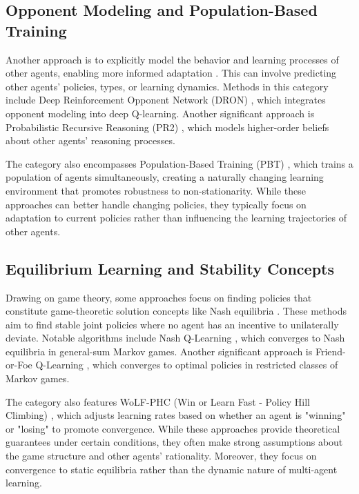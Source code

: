 \documentclass[a4paper,12pt]{report}
\begin{document}
\subsection{Opponent Modeling and Population-Based Training}
Another approach is to explicitly model the behavior and learning processes of other agents, enabling more informed adaptation \cite{albrecht2018autonomous, he2016opponent}. This can involve predicting other agents' policies, types, or learning dynamics. Methods in this category include Deep Reinforcement Opponent Network (DRON) \cite{he2016opponent}, which integrates opponent modeling into deep Q-learning. Another significant approach is Probabilistic Recursive Reasoning (PR2) \cite{wen2019probabilistic}, which models higher-order beliefs about other agents' reasoning processes.

The category also encompasses Population-Based Training (PBT) \cite{jaderberg2019human}, which trains a population of agents simultaneously, creating a naturally changing learning environment that promotes robustness to non-stationarity. While these approaches can better handle changing policies, they typically focus on adaptation to current policies rather than influencing the learning trajectories of other agents.

\subsection{Equilibrium Learning and Stability Concepts}
Drawing on game theory, some approaches focus on finding policies that constitute game-theoretic solution concepts like Nash equilibria \cite{bowling2005convergence, hu2003nash, littman2001friend}. These methods aim to find stable joint policies where no agent has an incentive to unilaterally deviate. Notable algorithms include Nash Q-Learning \cite{hu2003nash}, which converges to Nash equilibria in general-sum Markov games. Another significant approach is Friend-or-Foe Q-Learning \cite{littman2001friend}, which converges to optimal policies in restricted classes of Markov games.

The category also features WoLF-PHC (Win or Learn Fast - Policy Hill Climbing) \cite{bowling2002multiagent}, which adjusts learning rates based on whether an agent is "winning" or "losing" to promote convergence. While these approaches provide theoretical guarantees under certain conditions, they often make strong assumptions about the game structure and other agents' rationality. Moreover, they focus on convergence to static equilibria rather than the dynamic nature of multi-agent learning.
\end{document}
